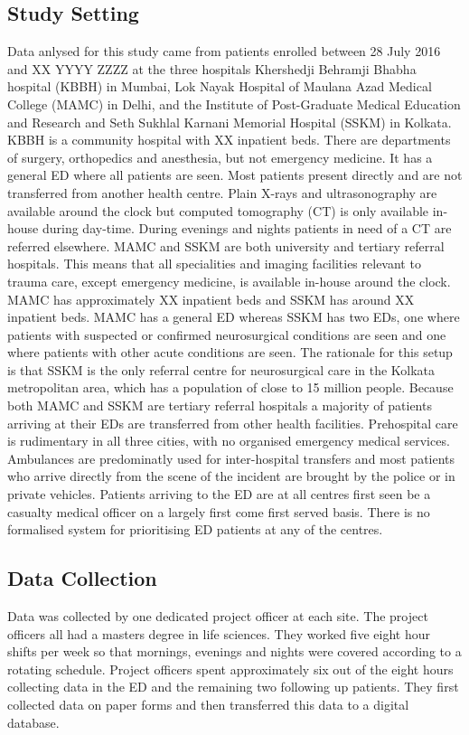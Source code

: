 \documentclass[10pt,letterpaper]{article}\usepackage[]{graphicx}\usepackage[]{color}
\begin{document}
\subsection*{Study Setting}
Data anlysed for this study came from patients enrolled between 28 July 2016 and
XX YYYY ZZZZ at the three hospitals Khershedji Behramji Bhabha hospital (KBBH)
in Mumbai, Lok Nayak Hospital of Maulana Azad Medical College (MAMC) in Delhi,
and the Institute of Post-Graduate Medical Education and Research and Seth
Sukhlal Karnani Memorial Hospital (SSKM) in Kolkata. KBBH is a community
hospital with XX inpatient beds. There are departments of surgery, orthopedics
and anesthesia, but not emergency medicine. It has a general ED where all
patients are seen. Most patients present directly and are not transferred from
another health centre. Plain X-rays and ultrasonography are available around the
clock but computed tomography (CT) is only available in-house during
day-time. During evenings and nights patients in need of a CT are referred
elsewhere. MAMC and SSKM are both university and tertiary referral
hospitals. This means that all specialities and imaging facilities relevant to
trauma care, except emergency medicine, is available in-house around the
clock. MAMC has approximately XX inpatient beds and SSKM has around XX inpatient
beds. MAMC has a general ED whereas SSKM has two EDs, one where patients with
suspected or confirmed neurosurgical conditions are seen and one where patients
with other acute conditions are seen. The rationale for this setup is that SSKM
is the only referral centre for neurosurgical care in the Kolkata metropolitan
area, which has a population of close to 15 million people. Because both MAMC
and SSKM are tertiary referral hospitals a majority of patients arriving at
their EDs are transferred from other health facilities. Prehospital care is
rudimentary in all three cities, with no organised emergency medical
services. Ambulances are predominatly used for inter-hospital transfers and most
patients who arrive directly from the scene of the incident are brought by the
police or in private vehicles. Patients arriving to the ED are at all centres
first seen be a casualty medical officer on a largely first come first served
basis. There is no formalised system for prioritising ED patients at any of the
centres.

\subsection*{Data Collection}
Data was collected by one dedicated project officer at each site. The project
officers all had a masters degree in life sciences. They worked five eight hour
shifts per week so that mornings, evenings and nights were covered according to
a rotating schedule. Project officers spent approximately six out of the eight
hours collecting data in the ED and the remaining two following up
patients. They first collected data on paper forms and then transferred this
data to a digital database.
\end{document}
